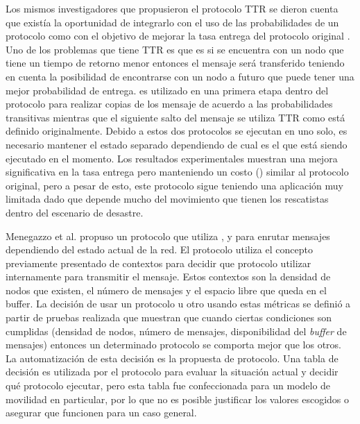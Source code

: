 Los mismos investigadores que propusieron el protocolo TTR se dieron cuenta que
existía la oportunidad de integrarlo con el uso de las probabilidades de un
protocolo como \maxprop{} con el objetivo de mejorar la tasa entrega del
protocolo original \cite{martin-campillo_energy-efficient_2012}. Uno de los
problemas que tiene TTR es que es si se encuentra con un nodo que tiene un
tiempo de retorno menor entonces el mensaje será transferido teniendo en cuenta
la posibilidad de encontrarse con un nodo a futuro que puede tener una mejor
probabilidad de entrega. \maxprop{} es utilizado en una primera etapa dentro del
protocolo para realizar copias de los mensaje de acuerdo a las probabilidades
transitivas mientras que el siguiente salto del mensaje se utiliza TTR como está
definido originalmente. Debido a estos dos protocolos se ejecutan en uno solo,
es necesario mantener el estado separado dependiendo de cual es el que está
siendo ejecutado en el momento. Los resultados experimentales muestran una
mejora significativa en la tasa entrega pero manteniendo un costo (\overhead)
similar al protocolo original, pero a pesar de esto, este protocolo sigue
teniendo una aplicación muy limitada dado que depende mucho del movimiento que
tienen los rescatistas dentro del escenario de desastre.


Menegazzo et al. \cite{DBLP:conf/monami/MenegazzoSA15} propuso un protocolo que
utiliza \epidemic, \syw{} y \prophet{} para enrutar mensajes dependiendo del
estado actual de la red. El protocolo utiliza el concepto previamente presentado
de contextos para decidir que protocolo utilizar internamente para transmitir el
mensaje.  Estos contextos son la densidad de nodos que existen, el número de
mensajes y el espacio libre que queda en el buffer. La decisión de usar un
protocolo u otro usando estas métricas se definió a partir de pruebas realizada
que muestran que cuando ciertas condiciones son cumplidas (densidad de nodos,
número de mensajes, disponibilidad del \textit{buffer} de mensajes) entonces un
determinado protocolo se comporta mejor que los otros. La automatización de esta
decisión es la propuesta de protocolo. Una tabla de decisión es utilizada por el
protocolo para evaluar la situación actual y decidir qué protocolo ejecutar,
pero esta tabla fue confeccionada para un modelo de movilidad en particular, por
lo que no es posible justificar los valores escogidos o asegurar que funcionen
para un caso general.





